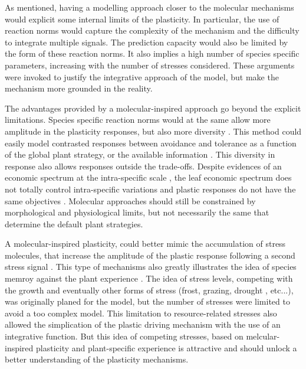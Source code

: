 As mentioned, having a modelling approach closer to the molecular mechanisms would explicit some internal limits of the plasticity. In particular, the use of reaction norms would capture the complexity of the mechanism and the difficulty to integrate multiple signals. The prediction capacity would also be limited by the form of these reaction norms. It also implies a high number of species specific parameters, increasing with the number of stresses considered. These arguments were invoked to justify the integrative approach of the model, but make the mechanism more grounded in the reality.

The advantages provided by a molecular-inspired approach go beyond the explicit limitations. Species specific reaction norms would at the same allow more amplitude in the plasticity responses, but also more diversity \parencite{kichenin_contrasting_2013, wellstein_intraspecific_2013}. This method could easily model contrasted responses between avoidance and tolerance as a function of the global plant strategy, \parencite{perez-ramos_tradeoffs_2013} or the available information \parencite{heger_light_2016}. This diversity in response also allows responses outside the trade-offs. Despite evidences of an economic spectrum at the intra-specific scale \parencite{hu_novel_2015, fajardo_intraspecific_2018}, the leaf economic spectrum does not totally control intra-specific variations \parencite{fajardo_intraspecific_2018} and plastic responses do not have the same objectives \parencite{ryser_consequences_2000}. Molecular approaches should still be constrained by morphological and physiological limits, but not necessarily the same that determine the default plant strategies.

A molecular-inspired plasticity, could better mimic the accumulation of stress molecules, that increase the amplitude of the plastic response following a second stress signal \cite{crisp_reconsidering_2016}. This type of mechanisms also greatly illustrates the idea of species memroy against the plant experience . The idea of stress levels, competing with the growth \cite{herms_dilemma_1992} and eventually other forms of stress (frost, grazing, drought , etc...), was originally planed for the model, but the number of stresses were limited to avoid a too complex model. This limitation to resource-related stresses also allowed the simplication of the plastic driving mechanism with the use of an integrative function. But this idea of competing stresses, based on melcular-inspired plasticity and plant-specific experience is attractive and should unlock a better understanding of the plasticity mechanisms.

